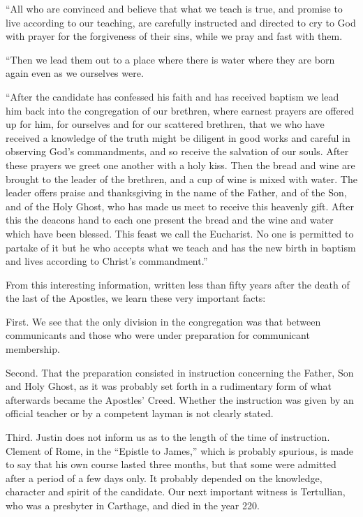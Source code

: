 “All who are convinced and believe that what we teach is true, and promise to live according to our teaching, are carefully instructed and directed to cry to God with prayer for the forgiveness of their sins, while we pray and fast with them.

“Then we lead them out to a place where there is water where they are born again even as we ourselves were.

“After the candidate has confessed his faith and has received baptism we lead him back into the congregation of our brethren, where earnest prayers are offered up for him, for ourselves and for our scattered brethren, that we who have received a knowledge of the truth might be diligent in good works and careful in observing God’s commandments, and so receive the salvation of our souls. After these prayers we greet one another with a holy kiss. Then the bread and wine are brought to the leader of the brethren, and a cup of wine is mixed with water. The leader offers praise and thanksgiving in the
name of the Father, and of the Son, and of the Holy Ghost, who has made us meet to receive this heavenly gift. After this the deacons hand to each one present the bread and the wine and water which have been blessed. This feast we call the Eucharist. No one is permitted to partake of it but he who accepts what we teach and has the new birth in baptism and lives according to Christ’s commandment.”

 From this interesting information, written less than fifty years after the death of the last of the Apostles, we learn these very important facts:

First. We see that the only division in the congregation was that between communicants and those who were under preparation for communicant membership.

Second. That the preparation consisted in instruction concerning the Father, Son and Holy Ghost, as it was probably set forth in a rudimentary form of what afterwards became the Apostles’ Creed. Whether the instruction was given by an official teacher or by a competent layman is not clearly stated.

Third. Justin does not inform us as to the length of the time of instruction. Clement of Rome, in the “Epistle to James,” which is probably spurious, is made to say that his own course lasted three months, but that some were admitted after a period of a few days only. It probably depended on
the knowledge, character and spirit of the candidate. Our next important witness is  Tertullian, who was a presbyter in Carthage, and died in the year 220.


